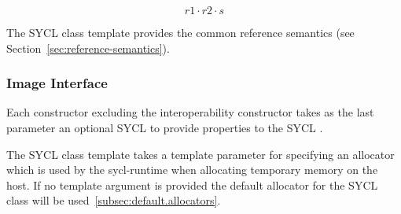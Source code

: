 \begin{equation}
\label{image-slice-pitch}
 r1 \cdot r2 \cdot s
\end{equation}

The SYCL  class template provides the common reference
semantics (see Section~\ref{sec:reference-semantics}).

\subsubsection{Image Interface}

Each constructor excluding the interoperability constructor takes as the last parameter an optional SYCL  to provide properties to the SYCL .

The SYCL  class template takes a template parameter  for specifying an allocator which is used by the \gls{sycl-runtime} when allocating temporary memory on the host. If no template argument is provided the default allocator for the SYCL  class  will be used~\ref{subsec:default.allocators}.



